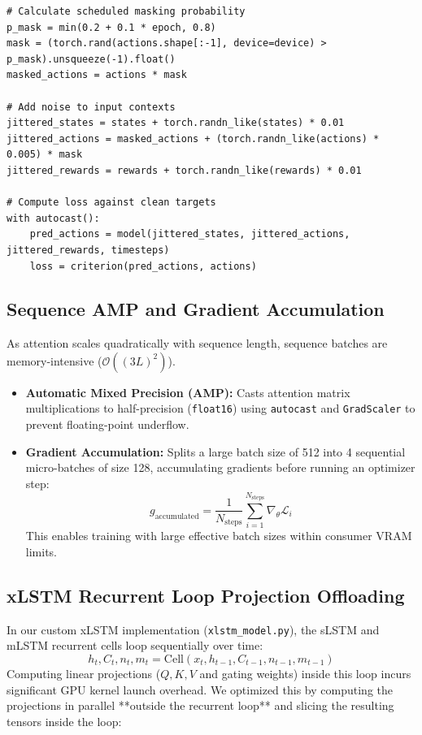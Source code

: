 \documentclass[11pt,a4paper]{article}
\begin{document}
\begin{lstlisting}[caption=Scheduled Masking and History Jitter Implementation]
# Calculate scheduled masking probability
p_mask = min(0.2 + 0.1 * epoch, 0.8)
mask = (torch.rand(actions.shape[:-1], device=device) > p_mask).unsqueeze(-1).float()
masked_actions = actions * mask

# Add noise to input contexts
jittered_states = states + torch.randn_like(states) * 0.01
jittered_actions = masked_actions + (torch.randn_like(actions) * 0.005) * mask
jittered_rewards = rewards + torch.randn_like(rewards) * 0.01

# Compute loss against clean targets
with autocast():
    pred_actions = model(jittered_states, jittered_actions, jittered_rewards, timesteps)
    loss = criterion(pred_actions, actions)
\end{lstlisting}

\subsection{Sequence AMP and Gradient Accumulation}
As attention scales quadratically with sequence length, sequence batches are memory-intensive ($\mathcal{O}((3L)^2)$). 
\begin{itemize}
    \item \textbf{Automatic Mixed Precision (AMP):} Casts attention matrix multiplications to half-precision (\texttt{float16}) using \texttt{autocast} and \texttt{GradScaler} to prevent floating-point underflow.
    \item \textbf{Gradient Accumulation:} Splits a large batch size of 512 into 4 sequential micro-batches of size 128, accumulating gradients before running an optimizer step:
    \begin{equation}
    g_{\text{accumulated}} = \frac{1}{N_{\text{steps}}} \sum_{i=1}^{N_{\text{steps}}} \nabla_{\theta} \mathcal{L}_i
    \end{equation}
    This enables training with large effective batch sizes within consumer VRAM limits.
\end{itemize}

\subsection{xLSTM Recurrent Loop Projection Offloading}
In our custom xLSTM implementation (\texttt{xlstm\_model.py}), the sLSTM and mLSTM recurrent cells loop sequentially over time:
\begin{equation}
h_t, C_t, n_t, m_t = \text{Cell}(x_t, h_{t-1}, C_{t-1}, n_{t-1}, m_{t-1})
\end{equation}
Computing linear projections ($Q, K, V$ and gating weights) inside this loop incurs significant GPU kernel launch overhead. We optimized this by computing the projections in parallel **outside the recurrent loop** and slicing the resulting tensors inside the loop:
\end{document}
